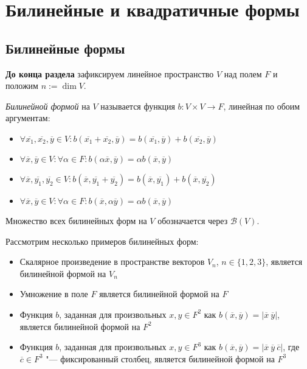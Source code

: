 \section{Билинейные и квадратичные формы}

\subsection{Билинейные формы}

\textbf{До конца раздела} зафиксируем линейное пространство $V$ над полем $F$ и положим $n := \dim{V}$.

\begin{definition}
	\textit{Билинейной формой} на $V$ называется функция $b: V \times V \rightarrow F$, линейная по обоим аргументам:
	\begin{itemize}
		\item $\forall \overline{x_1}, \overline{x_2}, \overline{y} \in V: b(\overline{x_1} + \overline{x_2}, \overline{y}) = b(\overline{x_1}, \overline{y}) + b(\overline{x_2}, \overline{y})$
		\item $\forall \overline{x}, \overline{y} \in V: \forall \alpha \in F: b(\alpha\overline{x}, \overline{y}) = \alpha b(\overline{x}, \overline{y})$
		\item $\forall \overline{x}, \overline{y_1}, \overline{y_2} \in V: b(\overline{x}, \overline{y_1} + \overline{y_2}) = b(\overline{x}, \overline{y_1}) + b(\overline{x}, \overline{y_2})$
		\item $\forall \overline{x}, \overline{y} \in V: \forall \alpha \in F: b(\overline{x}, \alpha\overline{y}) = \alpha b(\overline{x}, \overline{y})$
	\end{itemize}
	
	Множество всех билинейных форм на $V$ обозначается через $\mathcal{B}(V)$.
\end{definition}

\begin{example}
	Рассмотрим несколько примеров билинейных форм:
	\begin{itemize}
		\item Скалярное произведение в пространстве векторов $V_n$, $n \in \{1, 2, 3\}$, является билинейной формой на $V_n$
		\item Умножение в поле $F$ является билинейной формой на $F$
		\item Функция $b$, заданная для произвольных $x, y \in F^2$ как $b(\overline{x}, \overline{y}) = |\overline{x}~\overline{y}|$, является билинейной формой на $F^2$
		\item Функция $b$, заданная для произвольных $x, y \in F^3$ как $b(\overline{x}, \overline{y}) = |\overline{x}~\overline{y}~\overline{c}|$, где $\overline{c} \in F^3$ "--- фиксированный столбец, является билинейной формой на $F^3$
	\end{itemize}
\end{example} 

